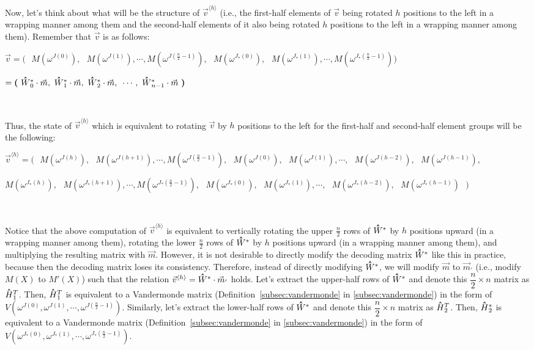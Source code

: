 Now, let's think about what will be the structure of $\vec{v}^{\langle h \rangle}$ (i.e., the first-half elements of $\vec{v}$ being rotated $h$ positions to the left in a wrapping manner among them and the second-half elements of it also being rotated $h$ positions to the left in a wrapping manner among them). Remember that $\vec{v}$ is as follows:

$\vec{v} = \bm{(} \text{ } 
M(\omega^{J(0)}), \text{ } M(\omega^{J(1)}), \cdots,  M(\omega^{J(\frac{n}{2}-1)}), \text{ } 
M(\omega^{J_*(0)}), \text{ } M(\omega^{J_*(1)}),  \cdots,  M(\omega^{J_*(\frac{n}{2}-1)}) \bm{)}$


\text{ } \text{ } $= \bm{(} \text{ } \hathat{W}^*_0\cdot \vec{m}, \text{ } \hathat{W}^*_1\cdot \vec{m}, \text{ } \hathat{W}^*_2\cdot \vec{m}, \text{ } \cdots, \text{ } \hathat{W}^*_{n - 1}\cdot \vec{m} \text{ } \bm{)} $ 

$ $

Thus, the state of $\vec{v}^{\langle h \rangle}$ which is equivalent to rotating $\vec{v}$ by $h$ positions to the left for the first-half and second-half element groups will be the following: 

$\vec{v}^{\langle h \rangle} = \bm{(} \text{ } M(\omega^{J(h)}), \text{ } M(\omega^{J(h+1)}), \cdots, M(\omega^{J(\frac{n}{2}-1)}), \text{ } M(\omega^{J(0)}), \text{ }M(\omega^{J(1)}), \cdots, \text{ } M(\omega^{J(h-2)}), \text{ } M(\omega^{J(h-1)}),$

\text{ }\text{ }\text{ } $ M(\omega^{J_*(h)}), \text{ } M(\omega^{J_*(h+1)}), \cdots, M(\omega^{J_*(\frac{n}{2}-1)}), \text{ } M(\omega^{J_*(0)}), \text{ }M(\omega^{J_*(1)}), \cdots, \text{ } M(\omega^{J_*(h-2)}), \text{ } M(\omega^{J_*(h-1)}) \text{ } \bm{)}$

$ $

Notice that the above computation of $\vec{v}^{\langle h \rangle}$ is equivalent to vertically rotating the upper $\frac{n}{2}$ rows of $\hathat{W}^*$ by $h$ positions upward (in a wrapping manner among them), rotating the lower $\frac{n}{2}$ rows of $\hathat{W}^{*}$ by $h$ positions upward (in a wrapping manner among them), and multiplying the resulting matrix with $\vec{m}$. However, it is not desirable to directly modify the decoding matrix $\hathat{W}^*$ like this in practice, because then the decoding matrix loses its consistency. Therefore, instead of directly modifying $\hathat{W}^*$, we will modify $\vec{m}$ to $\vec{m}_{'}$ (i.e., modify $M(X)$ to $M'(X)$) such that the relation $\vec{v}^{\langle h \rangle} = \hathat{W}^* \cdot \vec{m}_{'}$ holds. Let's extract the upper-half rows of $\hathat{W}^*$ and denote this $\dfrac{n}{2} \times n$ matrix as $\hathat{H}_1^T$. Then, $\hathat{H}_1^T$ is equivalent to a Vandermonde matrix (Definition~\ref*{subsec:vandermonde} in \autoref{subsec:vandermonde}) in the form of $V(\omega^{J(0)}, \omega^{J(1)}, \cdots, \omega^{J(\frac{n}{2}-1)})$. Similarly, let's extract the lower-half rows of $\hathat{W}^*$ and denote this $\dfrac{n}{2} \times n$ matrix as $\hathat{H}_2^T$. Then, $\hathat{H}_2^*$ is equivalent to a Vandermonde matrix (Definition~\ref*{subsec:vandermonde} in \autoref{subsec:vandermonde}) in the form of $V(\omega^{J_*(0)}, \omega^{J_*(1)}, \cdots, \omega^{J_*(\frac{n}{2}-1)})$. 

